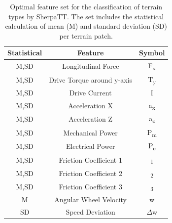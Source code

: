 \begin{table}[!htb]
   \centering
    \begin{supertabular}{ccc}
    \textbf{Statistical} & \textbf{Feature}  & \textbf{Symbol} \\
    \hline
     M,SD	&  Longitudinal Force	 & F\textsubscript{x} \\ 
     M,SD	&  Drive Torque	around y-axis  & T\textsubscript{y} \\ 
     M,SD	&  Drive Current	 & I \\  
     M,SD	&  Acceleration X	 &  a\textsubscript{x}\\ 
     M,SD	&  Acceleration Z	 & a\textsubscript{z} \\ 
     M,SD	&  Mechanical Power	 & P\textsubscript{m} \\ 
     M,SD	&  Electrical Power	 & P\textsubscript{e} \\ 
     M,SD	&  Friction Coefficient 1	 & \textmu \textsubscript{1} \\ 
     M,SD	&  Friction Coefficient 2 & \textmu \textsubscript{2}\\ 
     M,SD	&  Friction Coefficient 3	 & \textmu \textsubscript{3}\\ 
     M	    &  Angular Wheel Velocity	     &  w      \\ 
     SD    	&  Speed Deviation	 & $\Delta$w\\ 
    \end{supertabular}	
    \caption{Optimal feature set for the classification of terrain types by SherpaTT. The set includes the statistical calculation of mean (M) and standard deviation (SD) per terrain patch.\label{table:features2}}
\end{table}

%
%
